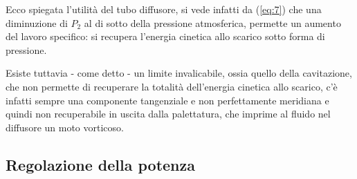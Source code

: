 \documentclass[a4paper, 15pt]{article}
\begin{document}
\begin{adjustwidth}{2in}{}
	Ecco spiegata l'utilità del tubo diffusore, si vede infatti da (\ref{eq:7}) che una diminuzione di $P_2$ al di sotto della pressione atmosferica, permette un aumento del lavoro specifico: si recupera l'energia cinetica allo scarico sotto forma di pressione. 
	
	Esiste tuttavia - come detto - un limite invalicabile, ossia quello della cavitazione, che non permette di recuperare la totalità dell'energia cinetica allo scarico, c'è infatti sempre una componente tangenziale e non perfettamente meridiana e quindi non recuperabile in uscita dalla palettatura, che imprime al fluido nel diffusore un moto vorticoso. 	
\end{adjustwidth}
		
		
		
\subsection{Regolazione della potenza}		
\end{document}
